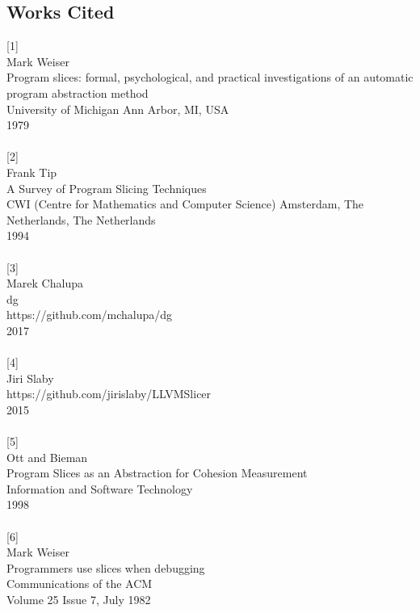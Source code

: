 \subsection{Works Cited}\label{works-cited}

\noindent
{[}1{]}\\
Mark Weiser\\
Program slices: formal, psychological, and practical investigations of
an automatic program abstraction method\\
University of Michigan Ann Arbor, MI, USA\\
1979
\\
\\
\noindent
{[}2{]}\\
Frank Tip\\
A Survey of Program Slicing Techniques\\
CWI (Centre for Mathematics and Computer Science) Amsterdam, The
Netherlands, The Netherlands\\
1994
\\
\\
\noindent
{[}3{]}\\
Marek Chalupa\\
dg\\
https://github.com/mchalupa/dg\\
2017
\\
\\
\noindent
{[}4{]}\\
Jiri Slaby\\
https://github.com/jirislaby/LLVMSlicer\\
2015
\\
\\
\noindent
{[}5{]}\\
Ott and Bieman\\
Program Slices as an Abstraction for Cohesion Measurement\\
Information and Software Technology\\
1998
\\
\\
\noindent
{[}6{]}\\
Mark Weiser\\
Programmers use slices when debugging\\
Communications of the ACM\\
Volume 25 Issue 7, July 1982
